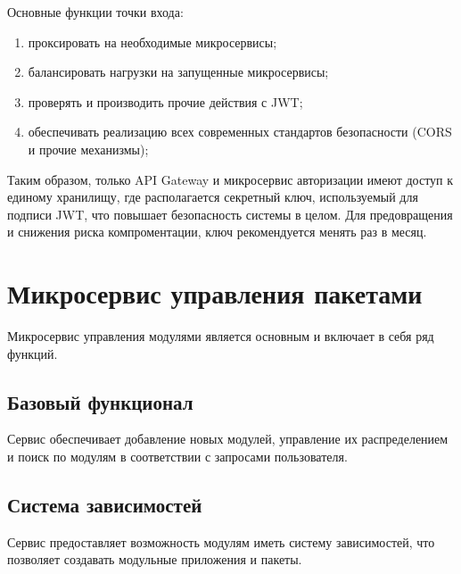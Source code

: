 Основные функции точки входа:
\begin{enumerate}
    \item проксировать на необходимые микросервисы;
    \item балансировать нагрузки на запущенные микросервисы;
    \item проверять и производить прочие действия с JWT;
    \item обеспечивать реализацию всех современных стандартов безопасности (CORS и прочие механизмы);
\end{enumerate}




Таким образом, только API Gateway и микросервис авторизации имеют доступ к единому хранилищу, где располагается секретный ключ, используемый для подписи JWT, что повышает безопасность системы в целом. Для предовращения и снижения риска компроментации, ключ рекомендуется менять раз в месяц. 

\section{Микросервис управления пакетами}

Микросервис управления модулями является основным и включает в себя ряд функций. 

\subsection{Базовый функционал}
Сервис обеспечивает добавление новых модулей, управление их распределением и поиск по модулям в соответствии с запросами пользователя.

\subsection{Система зависимостей}
Сервис предоставляет возможность модулям иметь систему зависимостей, что позволяет создавать модульные приложения и пакеты.


